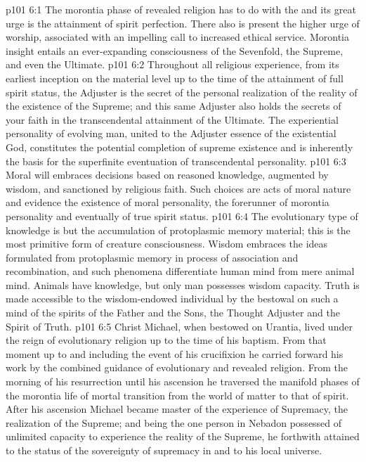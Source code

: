 \vs p101 6:1 The morontia phase of revealed religion has to do with the  and its great urge is the attainment of spirit perfection. There also is present the higher urge of worship, associated with an impelling call to increased ethical service. Morontia insight entails an ever\hyp{}expanding consciousness of the Sevenfold, the Supreme, and even the Ultimate.
\vs p101 6:2 Throughout all religious experience, from its earliest inception on the material level up to the time of the attainment of full spirit status, the Adjuster is the secret of the personal realization of the reality of the existence of the Supreme; and this same Adjuster also holds the secrets of your faith in the transcendental attainment of the Ultimate. The experiential personality of evolving man, united to the Adjuster essence of the existential God, constitutes the potential completion of supreme existence and is inherently the basis for the superfinite eventuation of transcendental personality.
\vs p101 6:3 \pc Moral will embraces decisions based on reasoned knowledge, augmented by wisdom, and sanctioned by religious faith. Such choices are acts of moral nature and evidence the existence of moral personality, the forerunner of morontia personality and eventually of true spirit status.
\vs p101 6:4 The evolutionary type of knowledge is but the accumulation of protoplasmic memory material; this is the most primitive form of creature consciousness. Wisdom embraces the ideas formulated from protoplasmic memory in process of association and recombination, and such phenomena differentiate human mind from mere animal mind. Animals have knowledge, but only man possesses wisdom capacity. Truth is made accessible to the wisdom\hyp{}endowed individual by the bestowal on such a mind of the spirits of the Father and the Sons, the Thought Adjuster and the Spirit of Truth.
\vs p101 6:5 \pc Christ Michael, when bestowed on Urantia, lived under the reign of evolutionary religion up to the time of his baptism. From that moment up to and including the event of his crucifixion he carried forward his work by the combined guidance of evolutionary and revealed religion. From the morning of his resurrection until his ascension he traversed the manifold phases of the morontia life of mortal transition from the world of matter to that of spirit. After his ascension Michael became master of the experience of Supremacy, the realization of the Supreme; and being the one person in Nebadon possessed of unlimited capacity to experience the reality of the Supreme, he forthwith attained to the status of the sovereignty of supremacy in and to his local universe.
